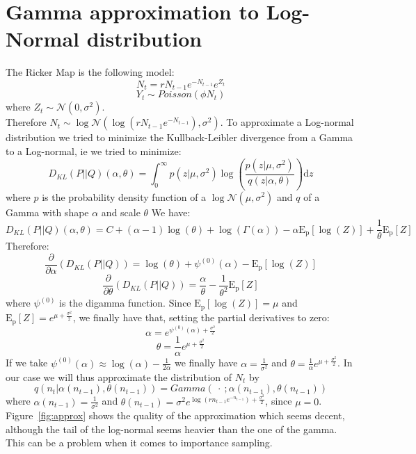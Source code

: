\documentclass{article}
\begin{document}
\section*{Gamma approximation to Log-Normal distribution}
The Ricker Map is the following model:
\begin{equation*}
N_t = rN_{t-1}e^{-N_{t-1}}e^{Z_t}
\end{equation*}
\begin{equation*}
Y_t \sim Poisson(\phi N_t)
\end{equation*}
where $Z_t \sim \mathcal{N} (0,\sigma^2)$.\\
Therefore $N_t \sim \log\mathcal{N} (\log{(rN_{t-1}e^{-N_{t-1}})},\sigma^2)$. To approximate a Log-normal distribution we tried to minimize the Kullback-Leibler divergence from a Gamma to a Log-normal, ie we tried to minimize:
\begin{equation*}
D_{KL}(P||Q)(\alpha, \theta) = \int_{0}^{\infty}{p(z|\mu, \sigma^2)\log(\frac{p(z|\mu, \sigma^2)}{q(z|\alpha, \theta)})\mathrm{d}z}
\end{equation*}
where $p$ is the probability density function of a $\log\mathcal{N}(\mu, \sigma^2)$ and $q$ of a Gamma with shape $\alpha$ and scale $\theta$
We have:
\begin{equation*}
D_{KL}(P||Q)(\alpha, \theta) = C + (\alpha-1)\log(\theta) + \log(\Gamma(\alpha)) - \alpha\mathrm{E_p}[\log(Z)] + \frac{1}{\theta}\mathrm{E_p}[Z]
\end{equation*}
Therefore:
\begin{equation*}
\frac{\partial }{\partial \alpha}(D_{KL}(P||Q)) = \log(\theta) + \psi^{(0)}(\alpha)-\mathrm{E_p}[\log(Z)]
\end{equation*}
\begin{equation*}
\frac{\partial }{\partial \theta}(D_{KL}(P||Q)) = \frac{\alpha}{\theta} - \frac{1}{\theta^2}\mathrm{E_p}[Z]
\end{equation*}
where $\psi^{(0)}$ is the digamma function.
\clearpage
Since $\mathrm{E_p}[\log(Z)]=\mu$ and $\mathrm{E_p}[Z] = e^{\mu+\frac{\sigma^2}{2}}$, we finally have that, setting the partial derivatives to zero:
\begin{equation*}
\alpha=e^{\psi^{(0)}(\alpha)+\frac{\sigma^2}{2}}
\end{equation*}
\begin{equation*}
\theta=\frac{1}{\alpha}e^{\mu+\frac{\sigma^2}{2}}
\end{equation*}
If we take $\psi^{(0)}(\alpha) \approx \log(\alpha)-\frac{1}{2\alpha}$ we finally have $\alpha =\frac{1}{\sigma^2}$ and $\theta=\frac{1}{\alpha}e^{\mu+\frac{\sigma^2}{2}}$.
In our case we will thus approximate the distribution of $N_t$ by
\begin{equation*}
q(n_t|\alpha(n_{t-1}), \theta(n_{t-1})) = Gamma(\ \cdot \ ; \alpha(n_{t-1}), \theta(n_{t-1}) )
\end{equation*}
where $ \alpha(n_{t-1})= \frac{1}{\sigma^2}$ and $\theta(n_{t-1})=\sigma^2e^{\log(rn_{t-1}e^{-n_{t-1}})+\frac{\sigma^2}{2}}$, since $\mu = 0$.\\
Figure~\ref{fig:approx} shows the quality of the approximation which seems decent, although the tail of the log-normal seems heavier than the one of the gamma. This can be a problem when it comes to importance sampling.
\end{document}
